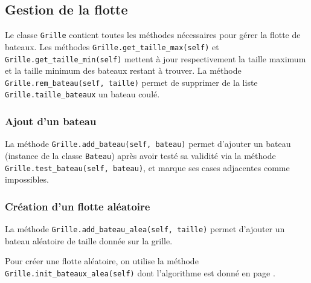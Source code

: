 \subsection{Gestion de la flotte}
Le classe \texttt{Grille} contient toutes les méthodes nécessaires pour gérer la flotte de bateaux. Les méthodes \texttt{Grille.get\_taille\_max(self)} et \texttt{Grille.get\_taille\_min(self)} mettent à jour respectivement la taille maximum et la taille minimum des bateaux restant à trouver. La méthode \texttt{Grille.rem\_bateau(self, taille)} permet de supprimer de la liste \texttt{Grille.taille\_bateaux} un bateau coulé.

\subsubsection{Ajout d'un bateau}
La méthode \texttt{Grille.add\_bateau(self, bateau)} permet d'ajouter un bateau (instance de la classe \texttt{Bateau}) après avoir testé sa validité via la méthode \texttt{Grille.test\_bateau(self, bateau)}, et marque ses cases adjacentes comme impossibles.

\subsubsection{Création d'un flotte aléatoire}
La méthode \texttt{Grille.add\_bateau\_alea(self, taille)} permet d'ajouter un bateau aléatoire de taille donnée sur la grille.

Pour créer une flotte aléatoire, on utilise la méthode \texttt{Grille.init\_bateaux\_alea(self)} dont l'algorithme est donné en page \pageref{init_alea}.


